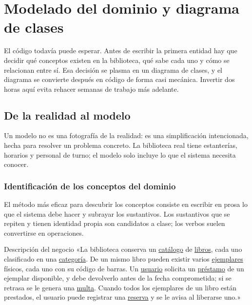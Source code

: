 \documentclass[11pt,a4paper,openany]{book}
\begin{document}
\chapter{Modelado del dominio y diagrama de clases}
\label{cap:modelado}

El código todavía puede esperar. Antes de escribir la primera entidad hay que decidir qué conceptos existen en la biblioteca, qué sabe cada uno y cómo se relacionan entre sí. Esa decisión se plasma en un diagrama de clases, y el diagrama se convierte después en código de forma casi mecánica. Invertir dos horas aquí evita rehacer semanas de trabajo más adelante.

\section{De la realidad al modelo}
\label{sec:realidad-modelo}

Un modelo no es una fotografía de la realidad: es una simplificación intencionada, hecha para resolver un problema concreto. La biblioteca real tiene estanterías, horarios y personal de turno; el modelo solo incluye lo que el sistema necesita conocer.

\subsection{Identificación de los conceptos del dominio}
\label{sec:conceptos}

El método más eficaz para descubrir los conceptos consiste en escribir en prosa lo que el sistema debe hacer y subrayar los sustantivos. Los sustantivos que se repiten y tienen identidad propia son candidatos a clase; los verbos suelen convertirse en operaciones.

\begin{cajaejemplo}{Descripción del negocio}
	«La biblioteca conserva un \underline{catálogo} de \underline{libros}, cada uno clasificado en una \underline{categoría}. De un mismo libro pueden existir varios \underline{ejemplares} físicos, cada uno con su código de barras. Un \underline{usuario} solicita un \underline{préstamo} de un ejemplar disponible, y debe devolverlo antes de la fecha comprometida; si se retrasa se le genera una \underline{multa}. Cuando todos los ejemplares de un libro están prestados, el usuario puede registrar una \underline{reserva} y se le avisa al liberarse uno.»
\end{cajaejemplo}
\end{document}
